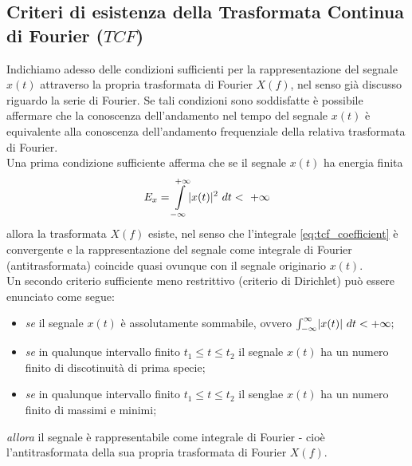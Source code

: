 \documentclass[12pt,oneside,openany]{memoir}
\numberwithin{equation}{subsection}
\DeclarePairedDelimiter{\abs}{\lvert}{\rvert}
\newcommand{\dt}{\ dt}
\begin{document}
\subsection{Criteri di esistenza della Trasformata Continua di Fourier ($TCF$)}
Indichiamo adesso delle condizioni sufficienti per la rappresentazione del
segnale $x(t)$ attraverso la propria trasformata di Fourier $X(f)$, nel senso
gi\`a discusso riguardo la serie di Fourier. Se tali condizioni sono soddisfatte
\`e possibile affermare che la conoscenza dell'andamento nel tempo del segnale
$x(t)$ \`e equivalente alla conoscenza dell'andamento frequenziale della
relativa trasformata di Fourier.\\
Una prima condizione sufficiente afferma che se il segnale $x(t)$ ha energia
finita
\begin{equation}
	E_x = \int\displaylimits_{-\infty}^{+\infty} \abs{x(t)}^2 \dt < \ +\infty
\end{equation}
allora la trasformata $X(f)$ esiste, nel senso che l'integrale
\eqref{eq:tcf_coefficient} \`e convergente e la rappresentazione del segnale
come integrale di Fourier (antitrasformata) coincide quasi ovunque con il
segnale originario $x(t)$.\\
Un secondo criterio sufficiente meno restrittivo (criterio di Dirichlet) pu\`o
essere enunciato come segue:
\begin{itemize}
	\item \textit{se} il segnale $x(t)$ \`e assolutamente sommabile, ovvero
		$\int_{-\infty}^{\infty} \abs{x(t)} \dt < +\infty;$
	\item \textit{se} in qualunque intervallo finito $t_1 \leq t \leq t_2$
		il segnale $x(t)$ ha un numero finito di discotinuit\`a di
		prima specie;
	\item \textit{se} in qualunque intervallo finito $t_1 \leq t \leq t_2$
		il senglae $x(t)$ ha un numero finito di massimi e minimi;
\end{itemize}
\textit{allora} il segnale \`e rappresentabile come integrale di Fourier -
cio\`e l'antitrasformata della sua propria trasformata di Fourier $X(f)$.


\newpage
\end{document}
